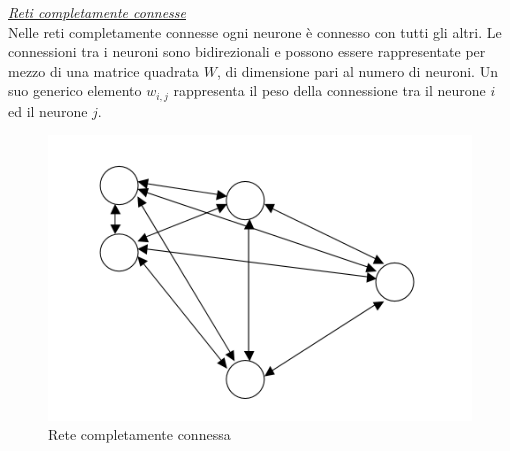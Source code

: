 \documentclass[12pt,a4paper,oneside]{book}
\begin{document}
		\underline{\emph{Reti completamente connesse}}\\
		Nelle reti completamente connesse ogni neurone è connesso con tutti gli altri. Le connessioni tra i neuroni sono bidirezionali e possono essere rappresentate per mezzo di una matrice quadrata $W$, di dimensione pari al numero di neuroni. Un suo generico elemento $w_{i,j}$ rappresenta il peso della connessione tra il neurone $i$ ed il neurone $j$.  
		
		\begin{figure}[h]
			\centering
			\includegraphics[width=0.7\linewidth]{IMMAGINI/completamenteconnesssa}
			\caption{ Rete completamente connessa}
			\label{fig:completamenteconnesssa}
		\end{figure}
		
\end{document}
